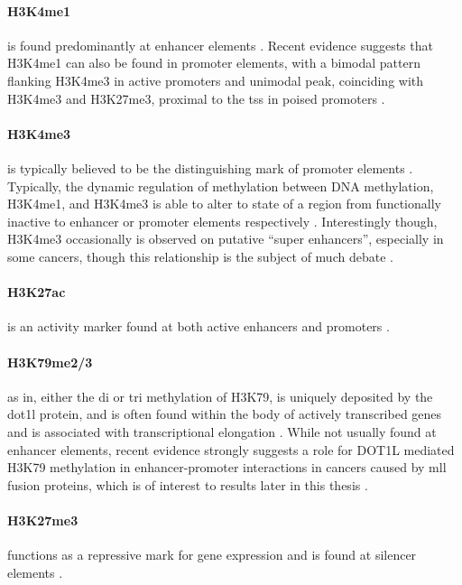 \paragraph{H3K4me1} is found predominantly at enhancer elements \cite{Gates2017}. Recent evidence suggests that H3K4me1 can also be found in promoter elements, with a bimodal pattern flanking H3K4me3 in active promoters and unimodal peak, coinciding with H3K4me3 and H3K27me3, proximal to the \gls{tss} in poised promoters \cite{Bae2020}.  

\paragraph{H3K4me3} is typically believed to be the distinguishing mark of promoter elements \cite{Gates2017}. Typically, the dynamic regulation of methylation between DNA methylation, H3K4me1, and H3K4me3 is able to alter to state of a region from functionally inactive to enhancer or promoter elements respectively \cite{Sharifi-Zarchi2017}. Interestingly though, H3K4me3 occasionally is observed on putative ``super enhancers'', especially in some cancers, though this relationship is the subject of much debate \cite{Li2019}.  

\paragraph{H3K27ac} is an activity marker found at both active enhancers and promoters \cite{Gates2017}.

\paragraph{H3K79me2/3} as in, either the di or tri methylation of H3K79, is uniquely deposited by the \gls{dot1l} protein, and is often found within the body of actively transcribed genes and is associated with transcriptional elongation \cite{DJ2008,Q2002a}. While not usually found at enhancer elements, recent evidence strongly suggests a role for DOT1L mediated H3K79 methylation in enhancer-promoter interactions in cancers caused by \gls{mll} fusion proteins, which is of interest to results later in this thesis \cite{Godfrey2019a}. 

\paragraph{H3K27me3} functions as a repressive mark for gene expression and is found at silencer elements \cite{Cai2021, Gates2017}. 

